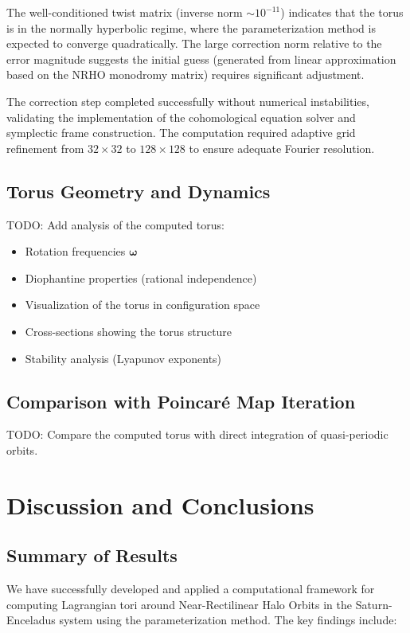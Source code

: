 \documentclass[review,onefignum,onetabnum]{siamart220329}
\begin{document}
The well-conditioned twist matrix (inverse norm $\sim 10^{-11}$) indicates that
the torus is in the normally hyperbolic regime, where the parameterization method
is expected to converge quadratically. The large correction norm relative to the
error magnitude suggests the initial guess (generated from linear approximation
based on the NRHO monodromy matrix) requires significant adjustment.

The correction step completed successfully without numerical instabilities,
validating the implementation of the cohomological equation solver and symplectic
frame construction. The computation required adaptive grid refinement from
$32 \times 32$ to $128 \times 128$ to ensure adequate Fourier resolution.

\subsection{Torus Geometry and Dynamics}

TODO: Add analysis of the computed torus:
\begin{itemize}
    \item Rotation frequencies $\boldsymbol{\omega}$
    \item Diophantine properties (rational independence)
    \item Visualization of the torus in configuration space
    \item Cross-sections showing the torus structure
    \item Stability analysis (Lyapunov exponents)
\end{itemize}

\subsection{Comparison with Poincaré Map Iteration}

TODO: Compare the computed torus with direct integration of quasi-periodic orbits.

\section{Discussion and Conclusions}
\label{sec:conclusion}

\subsection{Summary of Results}

We have successfully developed and applied a computational framework for computing
Lagrangian tori around Near-Rectilinear Halo Orbits in the Saturn-Enceladus
system using the parameterization method. The key findings include:
\end{document}
